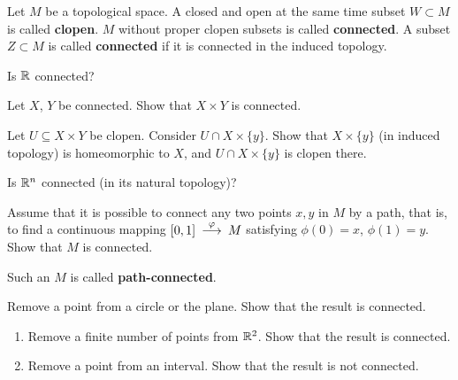 \documentclass[12pt]{article}
\begin{document}



\begin{opredelenie}
Let $M$ be a topological space.
A closed and open at the same time 
subset $W\subset M$ is called {\bf clopen}. 
$M$ without proper clopen subsets is called
{\bf connected}.
A subset $Z\subset M$ is called {\bf connected} if
it is connected in the induced topology. 
\end{opredelenie}

\begin{zadacha}
Is ${\mathbb R}$ connected?
\end{zadacha}

\begin{zadacha}[!]
Let $X$, $Y$ be connected. Show that $X\times Y$ is connected.
\end{zadacha}

\begin{ukazanie}
Let 
$U\subseteq X\times Y$ be clopen.
Consider $U\cap X\times \{y\}$. Show that
$X\times \{y\}$ (in induced topology) is homeomorphic to 
$X$, and $U\cap X\times \{y\}$ is clopen there. 
\end{ukazanie}

\begin{zadacha}
Is ${\mathbb R}^n$ connected (in its natural topology)?
\end{zadacha}

\begin{zadacha}
Assume that it is possible to connect any two points $x, y$ in $M$
by a path, that is, to find a continuous mapping 
$[0,1] \stackrel {\varphi} {{\:\longrightarrow\:}} M$ satisfying
$\phi(0)=x$, $\phi(1)=y$. Show that
$M$ is connected.
\end{zadacha}

\begin{zamechanie} Such an $M$ is called {\bf path-connected}.
 \end{zamechanie}

\begin{zadacha}
Remove a point from a circle or the plane.
Show that the result is connected.
\end{zadacha}

\begin{zadacha}[!]
\begin{enumerate} \item Remove a finite number of points from ${\mathbb R}^2$.
Show that the result is connected.

\item Remove a point from an interval.
Show that the result is not connected.
\end{enumerate}
\end{zadacha}
\end{document}
